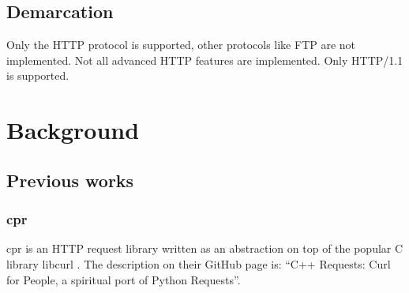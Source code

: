 \documentclass[12pt, a4paper]{article}
\begin{document}
\subsection{Demarcation}
Only the HTTP protocol is supported, other protocols like FTP are not implemented. Not all advanced HTTP features are implemented. Only HTTP/1.1 is supported.

\clearpage
\section{Background}
\subsection{Previous works}
\subsubsection{cpr}
cpr is an HTTP request library written as an abstraction on top of the popular C library libcurl \parencite{Cpr}. The description on their GitHub page is: “C++ Requests: Curl for People, a spiritual port of Python Requests”.
\end{document}
